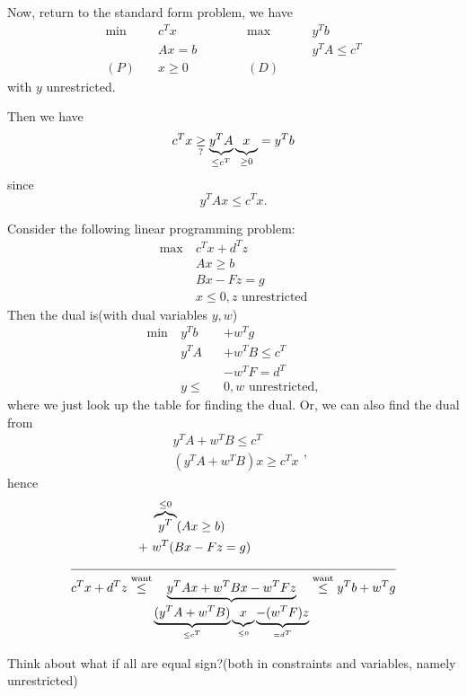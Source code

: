 Now, return to the standard form problem, we have
\[
	\begin{alignedat}{5}
		\min~&c^{T}x\qquad\qquad &&\max ~ &&y^{T}b\\
		&Ax = b && &&y^{T}A\leq c^{T}\\
		(P)\quad&x\geq  0 &&(D)\quad&&
	\end{alignedat}
\]
with \(y\) unrestricted.

Then we have
\[
	c^{T}x\underset{?}{\geq} \underbrace{y^{T}A}_{\leq c^{T}}\underbrace{\vphantom{y^{T}A}x}_{\geq 0} = y^{T} b
\]
since \[
	y^{T}Ax\leq c^{T}x.
\]

\begin{eg}
	Consider the following linear programming problem:
	\begin{align*}
		\max~ & c^{T}x+d^{T}z                  \\
		      & Ax\geq b                       \\
		      & Bx - Fz = g                    \\
		      & x\leq 0, z\text{ unrestricted}
	\end{align*}
	Then the dual is(with dual variables \(y, w\))
	\[
		\begin{alignedat}{3}
			\min~ & y^{T}b   &&+w^{T}g            \\
			& y^{T}A  &&+w^{T}B  \leq c^{T} \\
			& &&-w^{T}F = d^{T}    \\
			& y\leq &&0, w \text{ unrestricted},
		\end{alignedat}
	\]
	where we just look up the table for finding the dual. Or, we can also find the dual from
	\[
		\begin{split}
			&y^{T} A + w^{T} B\leq c^{T}\\
			&(y^{T} A+w^{T} B)x\geq c^{T} x
		\end{split},
	\]
	hence
	\[
		\begin{split}
			&\overbrace{y^{T}}^{\leq 0}(Ax\geq b)\\
			+\ &w^{T}(Bx - Fz = g)\\
			\cline{1-2}
			c^{T}x + d^{T}z\overset{\text{want}}{\leq}&\underbrace{y^{T}Ax + w^{T}Bx - w^{T} Fz}_{\underbrace{(y^{T} A + w^{T} B)}_{\leq c^{T}}\underbrace{\vphantom{y^{T}A}x}_{\leq 0} \underbrace{- (w^{T} F)z}_{=d^{T}}} \overset{\text{want}}{\leq} y^{T}b+w^{T}g
		\end{split}
	\]
\end{eg}
\begin{remark}
	Think about what if all are equal sign?(both in constraints and variables, namely unrestricted)
\end{remark}

